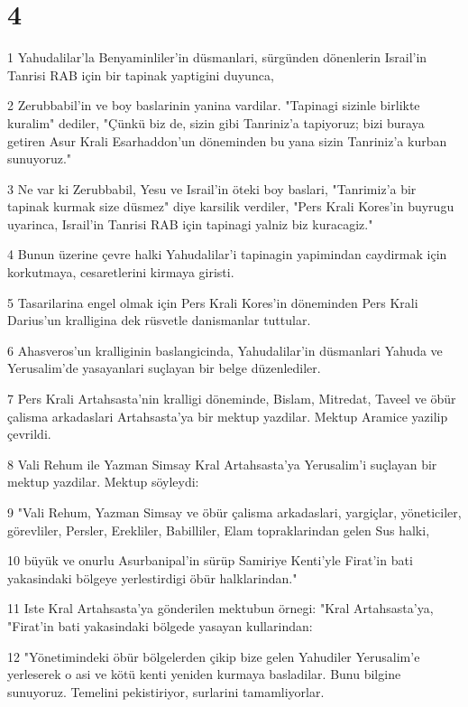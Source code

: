 \chapter{4}

\par 1 Yahudalilar'la Benyaminliler'in düsmanlari, sürgünden dönenlerin Israil'in Tanrisi RAB için bir tapinak yaptigini duyunca,
\par 2 Zerubbabil'in ve boy baslarinin yanina vardilar. "Tapinagi sizinle birlikte kuralim" dediler, "Çünkü biz de, sizin gibi Tanriniz'a tapiyoruz; bizi buraya getiren Asur Krali Esarhaddon'un döneminden bu yana sizin Tanriniz'a kurban sunuyoruz."
\par 3 Ne var ki Zerubbabil, Yesu ve Israil'in öteki boy baslari, "Tanrimiz'a bir tapinak kurmak size düsmez" diye karsilik verdiler, "Pers Krali Kores'in buyrugu uyarinca, Israil'in Tanrisi RAB için tapinagi yalniz biz kuracagiz."
\par 4 Bunun üzerine çevre halki Yahudalilar'i tapinagin yapimindan caydirmak için korkutmaya, cesaretlerini kirmaya giristi.
\par 5 Tasarilarina engel olmak için Pers Krali Kores'in döneminden Pers Krali Darius'un kralligina dek rüsvetle danismanlar tuttular.
\par 6 Ahasveros'un kralliginin baslangicinda, Yahudalilar'in düsmanlari Yahuda ve Yerusalim'de yasayanlari suçlayan bir belge düzenlediler.
\par 7 Pers Krali Artahsasta'nin kralligi döneminde, Bislam, Mitredat, Taveel ve öbür çalisma arkadaslari Artahsasta'ya bir mektup yazdilar. Mektup Aramice yazilip çevrildi.
\par 8 Vali Rehum ile Yazman Simsay Kral Artahsasta'ya Yerusalim'i suçlayan bir mektup yazdilar. Mektup söyleydi:
\par 9 "Vali Rehum, Yazman Simsay ve öbür çalisma arkadaslari, yargiçlar, yöneticiler, görevliler, Persler, Erekliler, Babilliler, Elam topraklarindan gelen Sus halki,
\par 10 büyük ve onurlu Asurbanipal'in sürüp Samiriye Kenti'yle Firat'in bati yakasindaki bölgeye yerlestirdigi öbür halklarindan."
\par 11 Iste Kral Artahsasta'ya gönderilen mektubun örnegi: "Kral Artahsasta'ya, "Firat'in bati yakasindaki bölgede yasayan kullarindan:
\par 12 "Yönetimindeki öbür bölgelerden çikip bize gelen Yahudiler Yerusalim'e yerleserek o asi ve kötü kenti yeniden kurmaya basladilar. Bunu bilgine sunuyoruz. Temelini pekistiriyor, surlarini tamamliyorlar.
